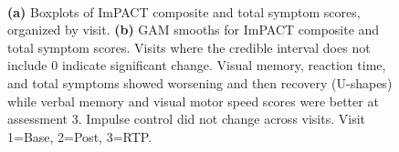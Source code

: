\documentclass[12pt]{article}
\begin{document}
\begin{figure}[H]
	\\
	\caption{\textbf{(a)} Boxplots of ImPACT composite and total symptom scores, organized by visit. \textbf{(b)} GAM smooths for ImPACT composite and total symptom scores. Visits where the credible interval does not include 0 indicate significant change. Visual memory, reaction time, and total symptoms showed worsening and then recovery (U-shapes) while verbal memory and visual motor speed scores were better at assessment 3. Impulse control did not change across visits. Visit 1=Base, 2=Post, 3=RTP.}
	\label{fig:imp-gam}
\end{figure}
\end{document}
